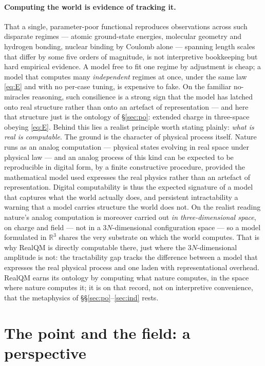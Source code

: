 \documentclass[11pt]{article}
\begin{document}
\paragraph{Computing the world is evidence of tracking it.} That a single, parameter-poor functional
reproduces observations across such disparate regimes --- atomic ground-state energies, molecular geometry
and hydrogen bonding, nuclear binding by Coulomb alone --- spanning length scales that differ by some five
orders of magnitude, is not interpretive bookkeeping but hard empirical evidence. A model free to fit one
regime by adjustment is cheap; a model that computes many \emph{independent} regimes at once, under the same
law \eqref{eq:E} and with no per-case tuning, is expensive to fake. On the familiar no-miracles reasoning,
such consilience is a strong sign that the model has latched onto real structure rather than onto an
artefact of representation --- and here that structure just is the ontology of \S\ref{sec:po}: extended
charge in three-space obeying \eqref{eq:E}. Behind this lies a realist principle worth stating plainly:
\emph{what is real is computable}. The ground is the character of physical process itself. Nature runs as an
analog computation --- physical states evolving in real space under physical law --- and an analog process
of this kind can be expected to be reproducible in digital form, by a finite constructive procedure,
provided the mathematical model used expresses the real physics rather than an artefact of representation.
Digital computability is thus the expected signature of a model that captures what the world actually does,
and persistent intractability a warning that a model carries structure the world does not. On the realist
reading nature's analog computation is moreover carried out \emph{in three-dimensional space}, on charge and
field --- not in a $3N$-dimensional configuration space --- so a model formulated in $\mathbb R^3$ shares the
very substrate on which the world computes. That is why RealQM is directly computable there, just where the
$3N$-dimensional amplitude is not: the tractability gap tracks the difference between a model that expresses
the real physical process and one laden with representational overhead. RealQM earns its ontology by
computing what nature computes, in the space where nature computes it; it is on that record, not on
interpretive convenience, that the metaphysics of \S\S\ref{sec:po}--\ref{sec:ind} rests.

\section{The point and the field: a perspective}
\label{sec:sm}
\end{document}
